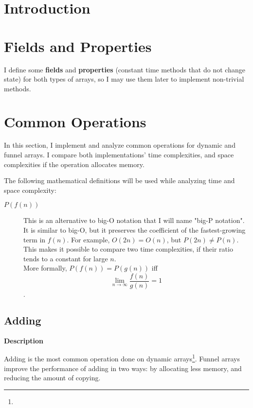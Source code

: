 \documentclass{article}
\newcommand{\descriptn}{\textbf{Description}}
\newcommand{\bigo}{O}
\newcommand{\biggo}{P}
\begin{document}
	\begin{abstract}
	\end{abstract}

	\section{Introduction}

	
	
	\section{Fields and Properties}
	
	I define some \textbf{fields} and \textbf{properties} (constant time methods that do not change state) for both types of arrays, so I may use them later to implement non-trivial methods.
	
	\section{Common Operations}
	
	In this section, I implement and analyze common operations for dynamic and funnel arrays. I compare both implementations' time complexities, and space complexities if the operation allocates memory.
	
	The following mathematical definitions will be used while analyzing time and space complexity:
	
	\begin{description}
		\item[$\biggo(f(n))$] This is an alternative to big-O notation that I will name "big-P notation". It is similar to big-O, but it preserves the coefficient of the fastest-growing term in $f(n)$. For example, $\bigo(2n) = \bigo(n)$, but $\biggo(2n) \neq \biggo(n)$. This makes it possible to compare two time complexities, if their ratio tends to a constant for large $n$.\\
		More formally, $\biggo(f(n)) = \biggo(g(n))$ iff $$\lim_{n \to \infty} {\frac{f(n)}{g(n)}} = 1$$.
	\end{description}
	
	\subsection{Adding}
	
	\descriptn
	
	Adding is the most common operation done on dynamic arrays\footnote{}. Funnel arrays improve the performance of adding in two ways: by allocating less memory, and reducing the amount of copying.
	
\end{document}
